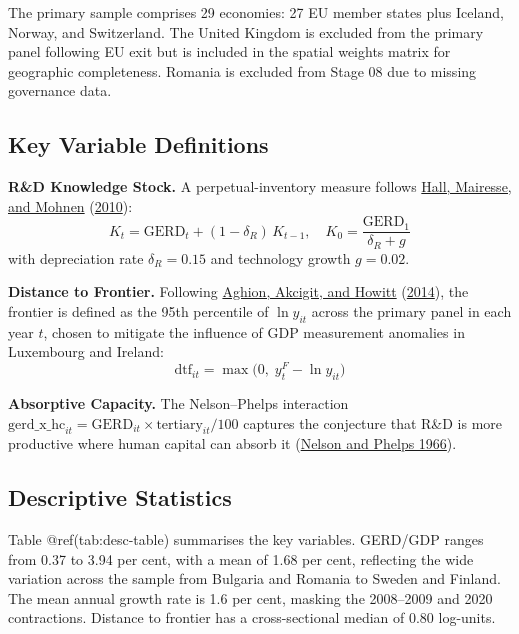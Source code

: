 \documentclass[
  11pt,
]{article}
\begin{document}
The primary sample comprises 29 economies: 27 EU member states plus Iceland, Norway, and Switzerland. The United Kingdom is excluded from the primary panel following EU exit but is included in the spatial weights matrix for geographic completeness. Romania is excluded from Stage 08 due to missing governance data.

\hypertarget{key-variable-definitions}{%
\subsection{Key Variable Definitions}\label{key-variable-definitions}}

\textbf{R\&D Knowledge Stock.} A perpetual-inventory measure follows \protect\hyperlink{ref-hall2010}{Hall, Mairesse, and Mohnen} (\protect\hyperlink{ref-hall2010}{2010}):
\[K_t = \text{GERD}_t + (1 - \delta_R)\,K_{t-1}, \quad K_0 = \frac{\text{GERD}_1}{\delta_R + g}\]
with depreciation rate \(\delta_R = 0.15\) and technology growth \(g = 0.02\).

\textbf{Distance to Frontier.} Following \protect\hyperlink{ref-aghion2014}{Aghion, Akcigit, and Howitt} (\protect\hyperlink{ref-aghion2014}{2014}), the frontier is defined as the 95th percentile of \(\ln y_{it}\) across the primary panel in each year \(t\), chosen to mitigate the influence of GDP measurement anomalies in Luxembourg and Ireland:
\[\text{dtf}_{it} = \max\!\bigl(0,\; y^{F}_{t} - \ln y_{it}\bigr)\]

\textbf{Absorptive Capacity.} The Nelson--Phelps interaction \(\text{gerd\_x\_hc}_{it} = \text{GERD}_{it} \times \text{tertiary}_{it}/100\) captures the conjecture that R\&D is more productive where human capital can absorb it (\protect\hyperlink{ref-nelsonphelps1966}{Nelson and Phelps 1966}).

\hypertarget{descriptive-statistics}{%
\subsection{Descriptive Statistics}\label{descriptive-statistics}}

Table @ref(tab:desc-table) summarises the key variables. GERD/GDP ranges from 0.37 to 3.94 per cent, with a mean of 1.68 per cent, reflecting the wide variation across the sample from Bulgaria and Romania to Sweden and Finland. The mean annual growth rate is 1.6 per cent, masking the 2008--2009 and 2020 contractions. Distance to frontier has a cross-sectional median of 0.80 log-units.
\end{document}
